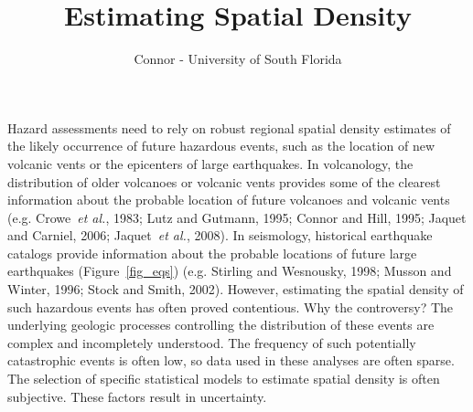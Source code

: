 \documentclass[10pt]{article}
\begin{document}
\title{Estimating Spatial Density}
\author{Connor - University of South Florida}
\maketitle
Hazard assessments need to rely on robust regional spatial density estimates of the likely occurrence of future hazardous events, such as the location of new volcanic vents or the epicenters of large earthquakes. In volcanology, the distribution of older volcanoes or volcanic vents provides some of the clearest information about the probable location of future volcanoes and volcanic vents (e.g. Crowe~{\it et al.}, 1983; Lutz and Gutmann, 1995; Connor and Hill, 1995; Jaquet and Carniel, 2006; Jaquet~{\it et al.}, 2008). In seismology, historical earthquake catalogs provide information about the probable locations of future large earthquakes (Figure~\ref{fig_eqs}) (e.g. Stirling and Wesnousky, 1998; Musson and Winter, 1996; Stock and Smith, 2002). However, estimating the spatial density of such hazardous events has often proved contentious. Why the controversy? The underlying geologic processes controlling the distribution of these events are complex and incompletely understood. The frequency of such potentially catastrophic events is often low, so data used in these analyses are often sparse. The selection of specific statistical models to estimate spatial density is often subjective. These factors result in uncertainty.
\end{document}
